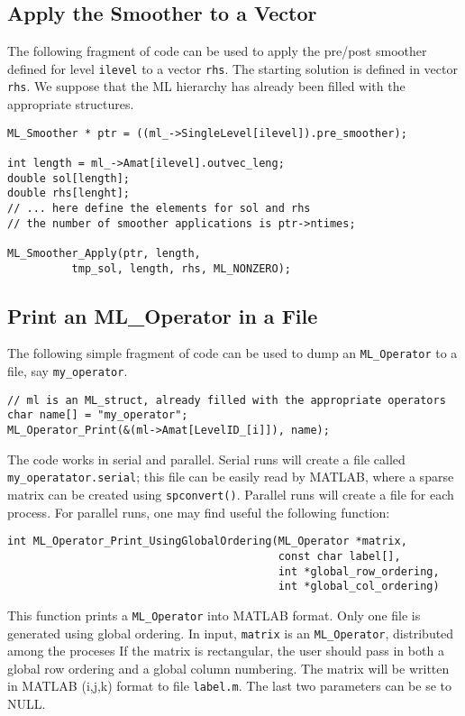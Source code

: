 \documentclass[10pt,letter,relax]{SANDreport}
\begin{document}
\subsection{Apply the Smoother to a Vector}

The following fragment of code can be used to apply the pre/post smoother
defined for level \verb!ilevel! to a vector \verb!rhs!. The starting solution
is defined in vector \verb!rhs!. We suppose that the ML hierarchy has already
been filled with the appropriate structures.
\begin{verbatim}
ML_Smoother * ptr = ((ml_->SingleLevel[ilevel]).pre_smoother);

int length = ml_->Amat[ilevel].outvec_leng;
double sol[length];
double rhs[lenght];
// ... here define the elements for sol and rhs
// the number of smoother applications is ptr->ntimes;

ML_Smoother_Apply(ptr, length,
		  tmp_sol, length, rhs, ML_NONZERO);
\end{verbatim}

\subsection{Print an ML\_Operator in a File}

The following simple fragment of code can be used to dump an
\verb!ML_Operator! to a file, say \verb!my_operator!.
\begin{verbatim}
// ml is an ML_struct, already filled with the appropriate operators
char name[] = "my_operator";
ML_Operator_Print(&(ml->Amat[LevelID_[i]]), name);
\end{verbatim}
The code works in serial and parallel. Serial runs will create a file called
\verb!my_operatator.serial!; this file can be easily read by MATLAB, where a
sparse matrix can be created using \verb!spconvert()!. Parallel runs will
create a file for each process. For parallel runs, one may find useful the
following function:
\begin{verbatim}
int ML_Operator_Print_UsingGlobalOrdering(ML_Operator *matrix,
                                          const char label[],
                                          int *global_row_ordering,
                                          int *global_col_ordering)
\end{verbatim}
This function prints a \verb!ML_Operator! into MATLAB format. Only one file is generated using global ordering. 
In input, \verb!matrix! is an \verb!ML_Operator!, distributed among the proceses     
If the matrix is rectangular, the user should   pass in both a global row
ordering and a global column numbering. The
matrix will be written in MATLAB (i,j,k) format to file \verb!label.m!. The
last two parameters can be se to NULL.
\end{document}
